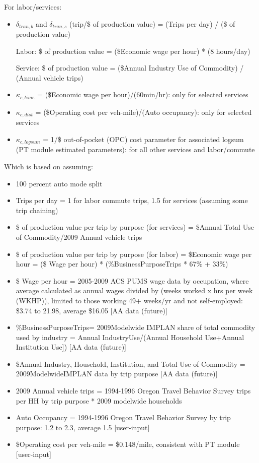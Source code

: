 \noindent For labor/services:
\begin{itemize}
\item $\delta_{tran,b}$ and $\delta_{tran,s}$ (trip/\$ of production value) = (Trips per day) / (\$ of production value)

Labor: \$ of production value = (\$Economic wage per hour) * (8 hours/day)

Service: \$ of production value = (\$Annual Industry Use of Commodity) / (Annual vehicle trips) 
\item $\kappa_{c,time}$ = (\$Economic wage per hour)/(60min/hr): only for selected services
\item $\kappa_{c,dist}$ = (\$Operating cost per veh-mile)/(Auto occupancy): only for selected services
\item $\kappa_{c,logsum}$ = 1/\$ out-of-pocket (OPC) cost parameter for associated logsum (PT module 
estimated parameters): for all other services and labor/commute
\end{itemize}

\noindent Which is based on assuming:
\begin{itemize}
\item 100 percent auto mode split
\item Trips per day = 1 for labor commute trips, 1.5 for services (assuming some trip chaining)
\item \$ of production value per trip by purpose (for services) = \$Annual Total Use of 
Commodity/2009 Annual vehicle trips
\item \$ of production value per trip by purpose (for labor) = \$Economic wage per hour = 
(\$ Wage per hour) * (\%BusinessPurposeTrips * 67\% + 33\%)
\item \$ Wage per hour =  2005-2009 ACS PUMS wage data by occupation, where average calculated as annual wages divided by (weeks worked x hrs per week (WKHP)), limited to those working 49+ weeks/yr and not self-employed: \$3.74 to 21.98, average \$16.05 [AA data (future)]
\item \%BusinessPurposeTrips= 2009Modelwide IMPLAN share of total commodity used by industry = Annual IndustryUse/(Annual Household Use+Annual Institution Use]) [AA data (future)]
\item \$Annual Industry, Household, Institution, and Total Use of Commodity = 2009ModelwideIMPLAN data by trip purpose [AA data (future)]
\item 2009 Annual vehicle trips = 1994-1996 Oregon Travel Behavior Survey trips per HH by 
trip purpose * 2009 modelwide households
\item Auto Occupancy = 1994-1996 Oregon Travel Behavior Survey by trip purpose: 1.2 to 2.3, 
average 1.5 [user-input]
\item \$Operating cost per veh-mile = \$0.148/mile, consistent with PT module [user-input]
\end{itemize}

